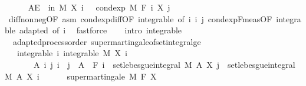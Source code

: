 \begin{isabellebody}
\ \ \ \ \isamarkupfalse%
\ {\isachardoublequoteopen}AE\ {\isasymxi}\ in\ M{\isachardot}{\kern0pt}\ X\ i\ {\isasymxi}\ {\isasymge}\ cond{\isacharunderscore}{\kern0pt}exp\ M\ {\isacharparenleft}{\kern0pt}F\ i{\isacharparenright}{\kern0pt}\ {\isacharparenleft}{\kern0pt}X\ j{\isacharparenright}{\kern0pt}\ {\isasymxi}{\isachardoublequoteclose}\ \isanewline
\ \ \ \ \ \ \isamarkupfalse%
\ diff{\isacharunderscore}{\kern0pt}nonneg{\isacharbrackleft}{\kern0pt}OF\ asm{\isacharbrackright}{\kern0pt}\ cond{\isacharunderscore}{\kern0pt}exp{\isacharunderscore}{\kern0pt}diff{\isacharbrackleft}{\kern0pt}OF\ integrable{\isacharparenleft}{\kern0pt}{}{\isacharcomma}{\kern0pt}{}{\isacharparenright}{\kern0pt}{\isacharcomma}{\kern0pt}\ of\ i\ i\ j{\isacharbrackright}{\kern0pt}\ cond{\isacharunderscore}{\kern0pt}exp{\isacharunderscore}{\kern0pt}F{\isacharunderscore}{\kern0pt}meas{\isacharbrackleft}{\kern0pt}OF\ integrable\ adapted{\isacharcomma}{\kern0pt}\ of\ i{\isacharbrackright}{\kern0pt}\ \isamarkupfalse%
\ fastforce\isanewline
\ \ \isacommand{{\isacharbraceright}{\kern0pt}}\isamarkupfalse%
\isanewline
{}\isamarkupfalse%
\ {\isacharparenleft}{\kern0pt}intro\ integrable{\isacharparenright}{\kern0pt}%
\endisatagproof
{\isafoldproof}%
%
\isadelimproof
\isanewline
%
\endisadelimproof
\isanewline
{}\isamarkupfalse%
\ {\isacharparenleft}{\kern0pt}\ adapted{\isacharunderscore}{\kern0pt}process{\isacharunderscore}{\kern0pt}order{\isacharparenright}{\kern0pt}\ supermartingale{\isacharunderscore}{\kern0pt}of{\isacharunderscore}{\kern0pt}set{\isacharunderscore}{\kern0pt}integral{\isacharunderscore}{\kern0pt}ge{\isacharcolon}{\kern0pt}\isanewline
\ \ \ integrable{\isacharcolon}{\kern0pt}\ {\isachardoublequoteopen}{\isasymAnd}i{\isachardot}{\kern0pt}\ integrable\ M\ {\isacharparenleft}{\kern0pt}X\ i{\isacharparenright}{\kern0pt}{\isachardoublequoteclose}\ \isanewline
\ \ \ \ \ \ \ {\isachardoublequoteopen}{\isasymAnd}A\ i\ j{\isachardot}{\kern0pt}\ i\ {\isasymle}\ j\ {\isasymLongrightarrow}\ A\ {\isasymin}\ F\ i\ {\isasymLongrightarrow}\ set{\isacharunderscore}{\kern0pt}lebesgue{\isacharunderscore}{\kern0pt}integral\ M\ A\ {\isacharparenleft}{\kern0pt}X\ j{\isacharparenright}{\kern0pt}\ {\isasymle}\ set{\isacharunderscore}{\kern0pt}lebesgue{\isacharunderscore}{\kern0pt}integral\ M\ A\ {\isacharparenleft}{\kern0pt}X\ i{\isacharparenright}{\kern0pt}{\isachardoublequoteclose}\ \isanewline
\ \ \ \ \ {\isachardoublequoteopen}supermartingale\ M\ F\ X{\isachardoublequoteclose}\isanewline

\end{isabellebody}
